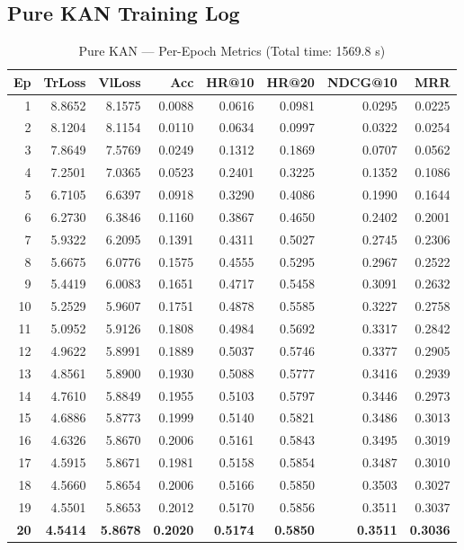 \documentclass[12pt,a4paper]{report}
\begin{document}
\subsection{Pure KAN Training Log}

\begin{table}[H]
\centering
\caption{Pure KAN --- Per-Epoch Metrics (Total time: 1569.8 s)}
\small
\begin{tabular}{r r r r r r r r}
\toprule
\textbf{Ep} & \textbf{TrLoss} & \textbf{VlLoss} & \textbf{Acc} & \textbf{HR@10} & \textbf{HR@20} & \textbf{NDCG@10} & \textbf{MRR} \\
\midrule
 1  & 8.8652 & 8.1575 & 0.0088 & 0.0616 & 0.0981 & 0.0295 & 0.0225 \\
 2  & 8.1204 & 8.1154 & 0.0110 & 0.0634 & 0.0997 & 0.0322 & 0.0254 \\
 3  & 7.8649 & 7.5769 & 0.0249 & 0.1312 & 0.1869 & 0.0707 & 0.0562 \\
 4  & 7.2501 & 7.0365 & 0.0523 & 0.2401 & 0.3225 & 0.1352 & 0.1086 \\
 5  & 6.7105 & 6.6397 & 0.0918 & 0.3290 & 0.4086 & 0.1990 & 0.1644 \\
 6  & 6.2730 & 6.3846 & 0.1160 & 0.3867 & 0.4650 & 0.2402 & 0.2001 \\
 7  & 5.9322 & 6.2095 & 0.1391 & 0.4311 & 0.5027 & 0.2745 & 0.2306 \\
 8  & 5.6675 & 6.0776 & 0.1575 & 0.4555 & 0.5295 & 0.2967 & 0.2522 \\
 9  & 5.4419 & 6.0083 & 0.1651 & 0.4717 & 0.5458 & 0.3091 & 0.2632 \\
10  & 5.2529 & 5.9607 & 0.1751 & 0.4878 & 0.5585 & 0.3227 & 0.2758 \\
11  & 5.0952 & 5.9126 & 0.1808 & 0.4984 & 0.5692 & 0.3317 & 0.2842 \\
12  & 4.9622 & 5.8991 & 0.1889 & 0.5037 & 0.5746 & 0.3377 & 0.2905 \\
13  & 4.8561 & 5.8900 & 0.1930 & 0.5088 & 0.5777 & 0.3416 & 0.2939 \\
14  & 4.7610 & 5.8849 & 0.1955 & 0.5103 & 0.5797 & 0.3446 & 0.2973 \\
15  & 4.6886 & 5.8773 & 0.1999 & 0.5140 & 0.5821 & 0.3486 & 0.3013 \\
16  & 4.6326 & 5.8670 & 0.2006 & 0.5161 & 0.5843 & 0.3495 & 0.3019 \\
17  & 4.5915 & 5.8671 & 0.1981 & 0.5158 & 0.5854 & 0.3487 & 0.3010 \\
18  & 4.5660 & 5.8654 & 0.2006 & 0.5166 & 0.5850 & 0.3503 & 0.3027 \\
19  & 4.5501 & 5.8653 & 0.2012 & 0.5170 & 0.5856 & 0.3511 & 0.3037 \\
\textbf{20} & \textbf{4.5414} & \textbf{5.8678} & \textbf{0.2020} & \textbf{0.5174} & \textbf{0.5850} & \textbf{0.3511} & \textbf{0.3036} \\
\bottomrule
\end{tabular}
\label{tab:kan_log}
\end{table}
\end{document}
